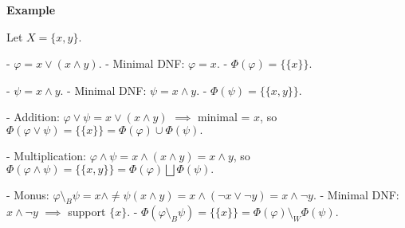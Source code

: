 \textbf{Example}

Let \(X=\{x,y\}\).

- \(\varphi = x \vee (x\wedge y)\).  
  - Minimal DNF: \(\varphi = x\).  
  - \(\Phi(\varphi) = \{\{x\}\}.\)

- \(\psi = x \wedge y\).  
  - Minimal DNF: \(\psi = x\wedge y\).  
  - \(\Phi(\psi) = \{\{x,y\}\}.\)

- Addition:  
  \(\varphi \vee \psi = x \vee (x\wedge y)\) $\implies$ minimal = \(x\), so  
  \(\Phi(\varphi\vee\psi) = \{\{x\}\} = \Phi(\varphi)\cup\Phi(\psi).\)

- Multiplication:  
  \(\varphi \wedge \psi = x\wedge(x\wedge y) = x\wedge y\), so  
  \(\Phi(\varphi\wedge\psi) = \{\{x,y\}\} = \Phi(\varphi)\bigsqcup\Phi(\psi).\)

- Monus:  
  \(\varphi\setminus_B\psi = x\wedge\ne\psi(x\wedge y) = x\wedge(\neg x\vee\neg y) = x\wedge\neg y\).  
  - Minimal DNF: \(x\wedge\neg y\) $\implies$ support \(\{x\}\).  
  - \(\Phi(\varphi\setminus_B\psi) = \{\{x\}\} = \Phi(\varphi)\setminus_W\Phi(\psi).\)